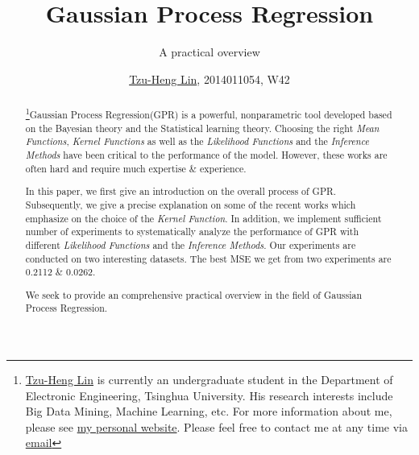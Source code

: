 \documentclass{sig-alternate-05-2015}
\begin{document}
\captionsetup[subfigure]{labelformat=empty}

\title{Gaussian Process Regression}
\subtitle{A practical overview}
\author{
    \alignauthor \color{blue}\href{http://lzhbrian.me}{Tzu-Heng Lin}\color{black}, 2014011054, W42\\
}


\maketitle
\begin{abstract}
\footnote{\color{blue}\href{http://lzhbrian.me}{Tzu-Heng Lin} \color{black} is currently an undergraduate student in the Department of Electronic Engineering, Tsinghua University. His research interests include Big Data Mining, Machine Learning, etc. For more information about me, please see \color{blue}\href{http://lzhbrian.me}{my personal website}\color{black}.
Please feel free to contact me at any time via \color{blue}\href{mailto:lzhbrian@gmail.com}{email} }Gaussian Process Regression(GPR) is a powerful, nonparametric tool developed based on the Bayesian theory and the Statistical learning theory. Choosing the right \emph{Mean Functions}, \emph{Kernel Functions} as well as the \emph{Likelihood Functions} and the \emph{Inference Methods} have been critical to the performance of the model. However, these works are often hard and require much expertise \& experience.

In this paper, we first give an introduction on the overall process of GPR. 
Subsequently, we give a precise explanation on some of the recent works which emphasize on the choice of the \emph{Kernel Function}.
In addition, we implement sufficient number of experiments to systematically analyze the performance of GPR with different \emph{Likelihood Functions} and the \emph{Inference Methods}. Our experiments are conducted on two interesting datasets. The best MSE we get from two experiments are 0.2112 \& 0.0262.

We seek to provide an comprehensive practical overview in the field of Gaussian Process Regression.

\end{abstract}




%
%
\printccsdesc
\end{document}
